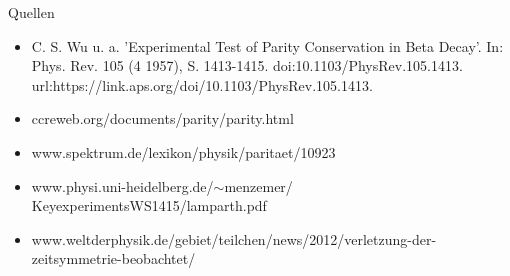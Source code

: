 \documentclass{beamer}
\begin{document}
\begin{frame}{Quellen}
\begin{itemize}
	\item C. S. Wu u. a. 'Experimental Test of Parity Conservation in Beta
Decay'. In: Phys. Rev. 105 (4 1957), S. 1413-1415. doi:10.1103/PhysRev.105.1413. url:https://link.aps.org/doi/10.1103/PhysRev.105.1413.
	\item ccreweb.org/documents/parity/parity.html
	\item www.spektrum.de/lexikon/physik/paritaet/10923
	\item www.physi.uni-heidelberg.de/$\sim$menzemer/ KeyexperimentsWS1415/lamparth.pdf
	\item www.weltderphysik.de/gebiet/teilchen/news/2012/verletzung-der-zeitsymmetrie-beobachtet/
\end{itemize}
\end{frame}

\begin{frame}
\maketitle
\end{frame}
\end{document}

